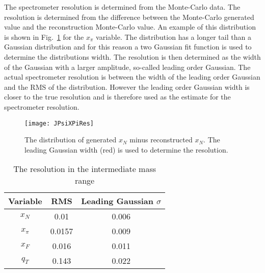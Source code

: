 The spectrometer resolution is determined from the Monte-Carlo data.  The
resolution is determined from the difference between the Monte-Carlo generated
value and the reconstruction Monte-Carlo value.  An example of this distribution
is shown in Fig.~\ref{fig::JPsiXPiRes} for the $x_\pi$ variable.  The
distribution has a longer tail than a Gaussian distribution and for this reason
a two Gaussian fit function is used to determine the distributions width.  The
resolution is then determined as the width of the Gaussian with a larger
amplitude, so-called leading order Gaussian.  The actual spectrometer resolution
is between the width of the leading order Gaussian and the RMS of the
distribution.  However the leading order Gaussian width is closer to the true
resolution and is therefore used as the estimate for the spectrometer
resolution.

\begin{figure}[h!t]
  \centering
  \texttt{[image: JPsiXPiRes]}
  \caption{The distribution of generated $x_N$ minus reconstructed $x_N$.  The
    leading Gaussian width (red) is used to determine the resolution.}
  \label{fig::JPsiXPiRes}
\end{figure}

\begin{table}[h!t]
  \centering
  \begin{tabular}{ |c|c|c| }
    \hline \textbf{Variable}& \textbf{RMS}& \textbf{Leading Gaussian $\sigma$}
    \\ \hline \hline
    
    $x_N$& 0.01& 0.006 \\ \hline

    $x_\pi$& 0.0157& 0.009 \\ \hline

    $x_F$& 0.016& 0.011 \\ \hline

    $q_T$& 0.143& 0.022 \\ \hline
  \end{tabular}
  \caption{The resolution in the intermediate mass range}
  \label{tab::JPsiRes}
\end{table}

